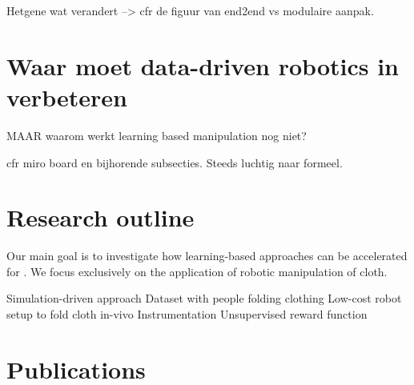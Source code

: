 \documentclass[\home/main.tex]{subfiles}
\begin{document}
Hetgene wat verandert --> cfr de figuur van end2end vs modulaire aanpak. 

\section{Waar moet data-driven robotics in verbeteren }
MAAR waarom werkt learning based manipulation nog niet? 

cfr miro board en bijhorende subsecties. Steeds luchtig naar formeel. 

\section{Research outline} 
Our main goal is to investigate how learning-based approaches can be accelerated for . We focus exclusively on the application of robotic manipulation of cloth.

Simulation-driven approach 
Dataset with people folding clothing
Low-cost robot setup to fold cloth in-vivo
Instrumentation
Unsupervised reward function

\section{Publications}
\end{document}
